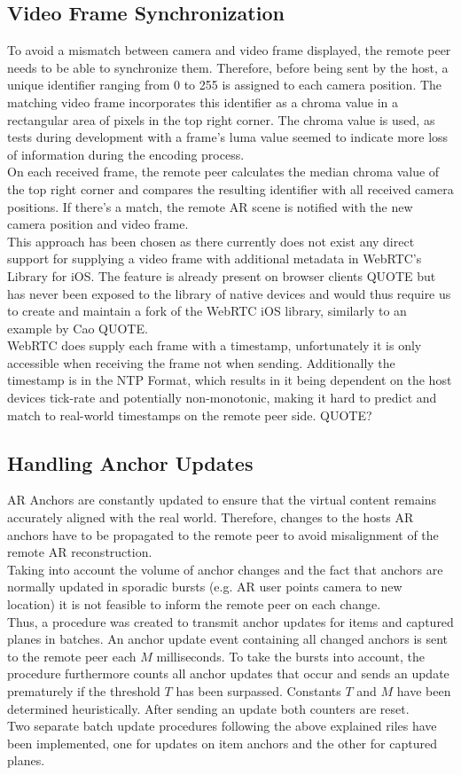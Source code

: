 \documentclass{article}
\begin{document}
\subsection{Video Frame Synchronization}
To avoid a mismatch between camera and video frame displayed, the remote peer needs to be able to synchronize them. Therefore, before being sent by the host, a unique identifier ranging from 0 to 255 is assigned to each camera position. The matching video frame incorporates this identifier as a chroma value in a rectangular area of pixels in the top right corner. The chroma value is used, as tests during development with a frame's luma value seemed to indicate more loss of information during the encoding process.\\
On each received frame, the remote peer calculates the median chroma value of the top right corner and compares the resulting identifier with all received camera positions. If there's a match, the remote AR scene is notified with the new camera position and video frame.   \\
This approach has been chosen as there currently does not exist any direct support for supplying a video frame with additional metadata in WebRTC's Library for iOS. The feature is already present on browser clients QUOTE but has never been exposed to the library of native devices and would thus require us to create and maintain a fork of the WebRTC iOS library, similarly to an example by Cao QUOTE.\\
WebRTC does supply each frame with a timestamp, unfortunately it is only accessible when receiving the frame not when sending. Additionally the timestamp is in the NTP Format, which results in it being dependent on the host devices tick-rate and potentially non-monotonic, making it hard to predict and match to real-world timestamps on the remote peer side. QUOTE?
\subsection{Handling Anchor Updates}
 AR Anchors are constantly updated to ensure that the virtual content remains accurately aligned with the real world. Therefore, changes to the hosts AR anchors have to be propagated to the remote peer to avoid misalignment of the remote AR reconstruction. \\
Taking into account the volume of anchor changes and the fact that anchors are normally updated in sporadic bursts (e.g. AR user points camera to new location) it is not feasible to inform the remote peer on each change.\\
Thus, a procedure was created to transmit anchor updates for items and captured planes in batches. An anchor update event containing all changed anchors is sent to the remote peer each $M$ milliseconds. To take the bursts into account, the procedure furthermore counts all anchor updates that occur and sends an update prematurely if the threshold $T$ has been surpassed. Constants $T$ and $M$ have been determined heuristically. After sending an update both counters are reset.\\
Two separate batch update procedures following the above explained riles have been implemented, one for updates on item anchors and the other for captured planes.
\end{document}
